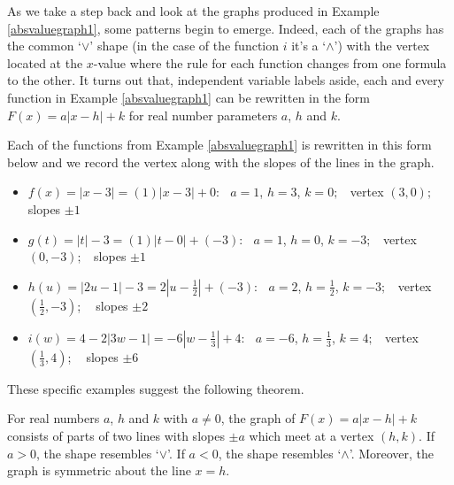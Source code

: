 \documentclass{ximera}
\begin{document}
\medskip

As we take a step back and look at the graphs produced in Example \ref{absvaluegraph1}, some patterns begin to emerge.  Indeed, each of the graphs has the common `$\vee$' shape (in the case of the function $i$ it's a `$\wedge$') with the vertex located at the $x$-value where the rule for each function changes from one formula to the other. It turns out that, independent variable labels aside, each and every function in Example \ref{absvaluegraph1} can be rewritten in the form $F(x) = a|x - h| + k$ for real number parameters $a$, $h$ and $k$.  

\medskip

Each of the functions from Example \ref{absvaluegraph1} is rewritten in this form below and we record the vertex along with the slopes of the lines in the graph.

\begin{itemize}


\item  $f(x) = |x - 3| = (1)|x - 3| + 0$: $\;\; a = 1$, $h = 3$, $k = 0; \;\;$ vertex $(3,0); \;\;$ slopes $\pm 1$

\item  $g(t) = |t| - 3 = (1)|t - 0| + (-3)$:  $\;\; a = 1$, $h = 0$, $k = -3; \;\;$  vertex $(0, -3); \;\;$ slopes $\pm 1$

\item  $h(u) = |2u - 1| - 3 = 2 \left| u - \frac{1}{2} \right| + (-3)$:  $\;\; a = 2$, $h = \frac{1}{2}$, $k = -3; \;\;$ vertex $\left(\frac{1}{2}, -3\right)$; $\;\;$ slopes $\pm 2$

\item  $i(w) = 4 - 2|3w - 1|  = -6 \left| w - \frac{1}{3} \right| + 4$:  $\;\; a = -6$, $h = \frac{1}{3}$, $k = 4; \;\;$ vertex $\left(\frac{1}{3}, 4\right)$; $\;\;$ slopes $\pm 6$

\end{itemize}


These specific examples suggest the following theorem.

\bigskip


\begin{theorem} \label{linearabsvaluegraphs}  For real numbers $a$, $h$ and $k$ with $a \neq 0$, the graph of $F(x) = a|x - h| + k$ consists of parts of two lines  with slopes $\pm a$ which meet at a vertex $(h, k)$.  If $a > 0$, the shape resembles `$\vee$'.  If $a<0$, the shape resembles `$\wedge$'.  Moreover, the graph is symmetric about the line $x = h$.

\end{theorem}
\end{document}
